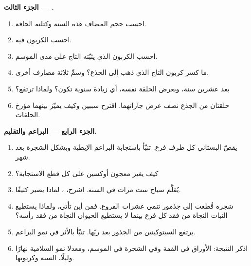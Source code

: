 \begin{problem}
\medskip
\noindent\textbf{الجزء الثالث --- .}
\begin{enumerate}[resume]
  \item احسب حجم  المضاف هذه السنة وكتلته الجافة.
  \item احسب الكربون فيه.
  \item احسب الكربون الذي يثبّته التاج على مدى الموسم.
  \item ما كسر كربون التاج الذي ذهب إلى  الجذع؟
        وسمِّ ثلاثة مصارف أخرى.
  \item بعد عشرين سنة، وبعرض الحلقة نفسه، أي زيادة 
        سنوية تكون؟ ولماذا ترتفع؟
  \item حلقتان من الجذع نصف عرض جاراتهما.
        اقترح سببين وكيف يميّز بينهما مؤرخ
        الحلقات.
\end{enumerate}

\medskip
\noindent\textbf{الجزء الرابع --- البراعم والتقليم.}
\begin{enumerate}[resume]
  \item يقصّ البستاني كل طرف فرع. تنبّأ باستجابة
        البراعم الإبطية وبشكل الشجرة بعد شهر.
  \item كيف يغير معجون أوكسين على كل قطع الاستجابة؟
  \item يُقلَّم سياج ست مرات في السنة. اشرح، ، لماذا يصير كثيفًا.
  \item شجرة قُطعت إلى جذمور تنمي عشرات الفروع. فمن أين
        تأتي، ولماذا يستطيع النبات النجاة من فقد كل
        فرع بينما لا يستطيع الحيوان النجاة من فقد رأسه؟
  \item يرتفع السيتوكينين من الجذور بعد ريّها.
        تنبّأ بالأثر في نمو البراعم.
  \item اذكر النتيجة: الأوراق في القمة وفي الشجرة في الموسم،
        ومعدلا نمو السلامية نهارًا وليلًا،  السنة وكربونها.
\end{enumerate}
\end{problem}
